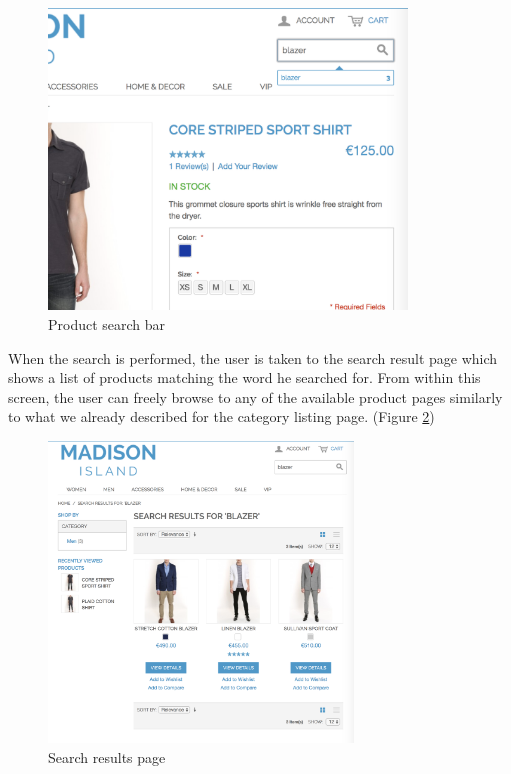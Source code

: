 \vspace{0.5cm}
\begin{figure}[H]
  \centering
    \includegraphics[height=8cm]{images/madison/search.png}
  \caption{Product search bar}
  \label{fig:product-search}
\end{figure}
\vspace{0.5cm}

When the search is performed, the user is taken to the search result page which shows a list of products matching the word he searched for. From within this screen, the user can freely browse to any of the available product pages similarly to what we already described for the category listing page. (Figure \ref{fig:search-results})

\vspace{0.5cm}
\begin{figure}[H]
  \centering
    \includegraphics[height=8cm]{images/madison/search-results.png}
  \caption{Search results page}
  \label{fig:search-results}
\end{figure}
\vspace{0.5cm}

